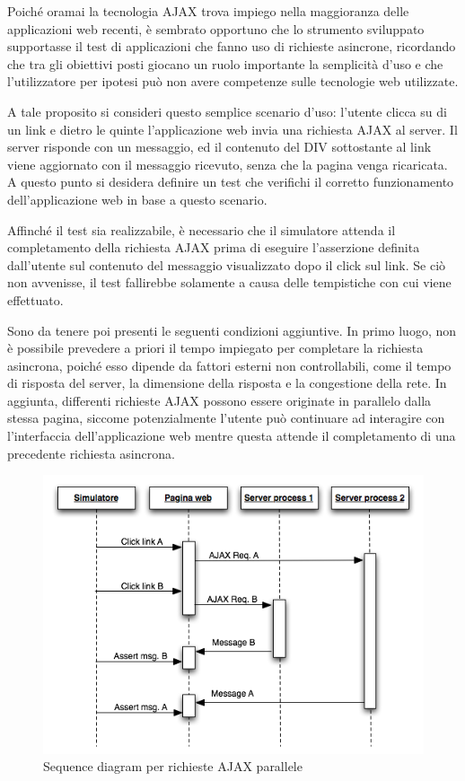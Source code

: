 \documentclass[12pt]{toptesi}
\begin{document}
Poiché oramai la tecnologia AJAX trova impiego nella maggioranza delle applicazioni web recenti, è sembrato opportuno che lo strumento sviluppato supportasse il test di applicazioni che fanno uso di richieste asincrone, ricordando che tra gli obiettivi posti giocano un ruolo importante la semplicità d'uso e che l'utilizzatore per ipotesi può non avere competenze sulle tecnologie web utilizzate. 

A tale proposito si consideri questo semplice scenario d'uso: l'utente clicca su di un link e dietro le quinte l'applicazione web invia una richiesta AJAX al server. Il server risponde con un messaggio, ed il contenuto del DIV sottostante al link viene aggiornato con il messaggio ricevuto, senza che la pagina venga ricaricata. A questo punto si desidera definire un test che verifichi il corretto funzionamento dell'applicazione web in base a questo scenario. 

Affinché il test sia realizzabile, è necessario che il simulatore attenda il completamento della richiesta AJAX prima di eseguire l'asserzione definita dall'utente sul contenuto del messaggio visualizzato dopo il click sul link. Se ciò non avvenisse, il test fallirebbe solamente a causa delle tempistiche con cui viene effettuato.

Sono da tenere poi presenti le seguenti condizioni aggiuntive. In primo luogo, non è possibile prevedere a priori il tempo impiegato per completare la richiesta asincrona, poiché esso dipende da fattori esterni non controllabili, come il tempo di risposta del server, la dimensione della risposta e la congestione della rete. In aggiunta, differenti richieste AJAX possono essere originate in parallelo dalla stessa pagina, siccome potenzialmente l'utente può continuare ad interagire con l'interfaccia dell'applicazione web mentre questa attende il completamento di una precedente richiesta asincrona.

\begin{figure}[htbp]
\begin{center}
\includegraphics[width=\textwidth]{images/ajax_sync.png}
\caption{Sequence diagram per richieste AJAX parallele}
\label{fig:ajaxSequence}
\end{center}
\end{figure}
\end{document}
